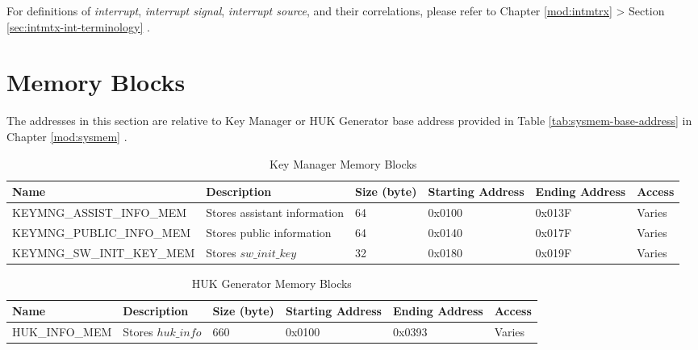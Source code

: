 \documentclass[main\_\_EN.tex]{subfiles}
\begin{document}
\begin{tiplisting}
For definitions of \textit{interrupt}, \textit{interrupt signal}, \textit{interrupt source}, and their correlations, please refer to Chapter \ref{mod:intmtrx} \textit{} > Section \ref{sec:intmtx-int-terminology} \textit{}.
\end{tiplisting}


\section{Memory Blocks}

The addresses in this section are relative to Key Manager or HUK Generator base address provided in Table \ref{tab:sysmem-base-address} in Chapter \ref{mod:sysmem} \textit{}.

\begin{longtable}{ | p{4.6cm} | p{4.3cm} | R{1cm} | R{1.5cm} | R{1.5cm} | R{1.2cm} | }
\caption{Key Manager Memory Blocks} \label{tab:keymng-mem-blocks}
\\ \hline
{}
\textbf{Name} & \textbf{Description}  &  \textbf{Size (byte)}  &  \textbf{Starting Address}  &  \textbf{Ending Address}  & \textbf{Access}   \\ \hline
KEYMNG\_ASSIST\_INFO\_MEM\label{mem:keymng-assist-info} & Stores assistant information &   64  &  0x0100  &  0x013F  &  Varies  \\ \hline
KEYMNG\_PUBLIC\_INFO\_MEM\label{mem:keymng-public-info} & Stores public information    &   64  &  0x0140  &  0x017F  &  Varies  \\ \hline
KEYMNG\_SW\_INIT\_KEY\_MEM\label{mem:keymng-sw-init-key} & Stores \begin{math}sw\_init\_key\end{math}  &   32  &  0x0180  &  0x019F  &  Varies  \\ \hline
\end{longtable}

\begin{longtable}{ | p{4.6cm} | p{4.3cm} | R{1cm} | R{1.5cm} | R{1.5cm} | R{1.2cm} | }
\caption{HUK Generator Memory Blocks} \label{tab:huk-mem-blocks}
\\ \hline
{}
\textbf{Name} & \textbf{Description}  &  \textbf{Size (byte)}  &  \textbf{Starting Address}  &  \textbf{Ending Address}  & \textbf{Access}   \\ \hline
HUK\_INFO\_MEM\label{mem:huk-info} & Stores \hyperref[para:hukinfo]{\begin{math}huk\_info\end{math}}  &  660  &  0x0100  &  0x0393  &  Varies  \\ \hline
\end{longtable}
\end{document}
